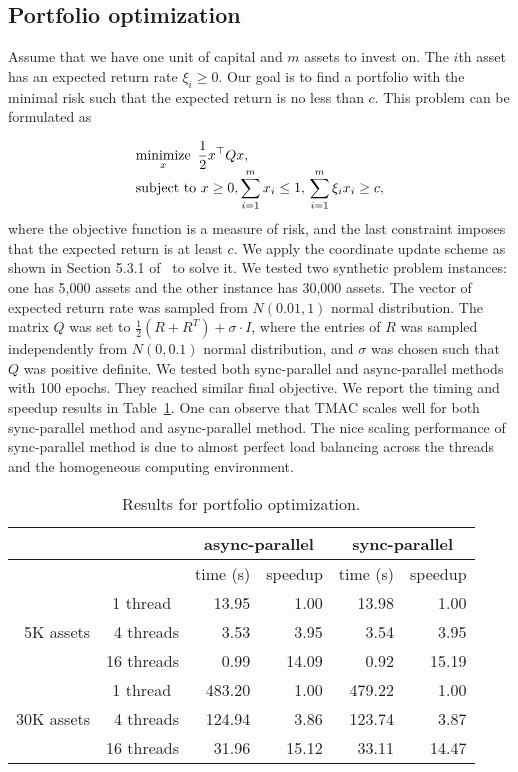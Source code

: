 \subsection{Portfolio optimization}
Assume that we have one unit of capital and $m$ assets to invest on. The $i$th asset has an expected return rate $\xi_i\ge 0$. Our goal is to find a portfolio with the minimal risk such that the expected return is no less than $c$. This problem can be formulated as

\begin{equation*}
\begin{array}{l}
\displaystyle
\operatorname*{minimize}_x ~ \frac{1}{2} x^\top Q x, \\
\displaystyle
\text{subject to}~ x\ge0, \sum_{i=1}^m x_i\le 1,\, \sum_{i=1}^m\xi_i x_i\ge c,
\end{array}
\end{equation*}
where the objective function is a measure of risk, and the last constraint imposes that the expected return is at least $c$. We apply the coordinate update scheme as shown in Section 5.3.1 of~\citep{PengWuXuYanYin2016_coordinate} to solve it.
We tested two synthetic  problem instances: one has 5,000 assets and the other instance has 30,000 assets.
The vector of expected return rate was sampled from $N(0.01, 1)$ normal distribution.
The matrix $Q$ was set to $\frac{1}{2} (R + R^T) + \sigma \cdot I$, where the entries of $R$ was sampled independently from $N(0, 0.1)$ normal distribution, and $\sigma$ was chosen such that $Q$ was positive definite.
We tested both sync-parallel and async-parallel methods with 100 epochs. They reached similar final objective. We report the timing and speedup results in Table~\ref{tab:port_opt}. One can observe that  TMAC scales well for both sync-parallel method and async-parallel method. The nice scaling performance of sync-parallel method is due to almost perfect load balancing across the threads and the homogeneous computing environment.
\begin{table}[!h]
\centering
\begin{tabular}{rrrrrr}
\toprule
\multirow{2}{*}{} & &  \multicolumn{2}{c}{async-parallel} & \multicolumn{2}{c}{sync-parallel} \\
\midrule
 & & time (s) & speedup & time (s) & speedup \\
 \midrule
 \multirow{3}{*}{5K assets} & 1 thread~ & 13.95& 1.00 & 13.98& 1.00 \\
  & 4 threads & 3.53& 3.95 &3.54 & 3.95\\
 & 16 threads & 0.99 &14.09 &0.92 & 15.19\\
\midrule
 \multirow{3}{*}{30K assets} & 1 thread~ & 483.20& 1.00& 479.22& 1.00 \\
  & 4 threads & 124.94& 3.86 &123.74 & 3.87\\
 & 16 threads & 31.96 &15.12 &33.11 & 14.47\\
\bottomrule
\end{tabular}
 \caption{\label{tab:port_opt}Results for portfolio optimization. }
\end{table}

